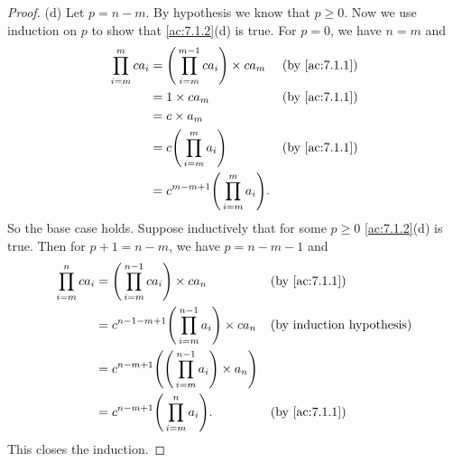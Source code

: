 \begin{proof}{(d)}
  Let \(p = n - m\).
  By hypothesis we know that \(p \geq 0\).
  Now we use induction on \(p\) to show that \cref{ac:7.1.2}(d) is true.
  For \(p = 0\), we have \(n = m\) and
  \begin{align*}
    \prod_{i = m}^m ca_i & = \Bigg(\prod_{i = m}^{m - 1} ca_i\Bigg) \times ca_m &  & \by{ac:7.1.1} \\
                         & = 1 \times ca_m                                      &  & \by{ac:7.1.1} \\
                         & = c \times a_m                                                          \\
                         & = c \Bigg(\prod_{i = m}^m a_i\Bigg)                  &  & \by{ac:7.1.1} \\
                         & = c^{m - m + 1} \Bigg(\prod_{i = m}^m a_i\Bigg).
  \end{align*}
  So the base case holds.
  Suppose inductively that for some \(p \geq 0\) \cref{ac:7.1.2}(d) is true.
  Then for \(p + 1 = n - m\), we have \(p = n - m - 1\) and
  \begin{align*}
    \prod_{i = m}^n ca_i & = \Bigg(\prod_{i = m}^{n - 1} ca_i\Bigg) \times ca_n                         &  & \by{ac:7.1.1} \\
                         & = c^{n - 1 - m + 1} \Bigg(\prod_{i = m}^{n - 1} a_i\Bigg) \times ca_n        &  & \byIH         \\
                         & = c^{n - m + 1} \Bigg(\Bigg(\prod_{i = m}^{n - 1} a_i\Bigg) \times a_n\Bigg)                    \\
                         & = c^{n - m + 1} \Bigg(\prod_{i = m}^n a_i\Bigg).                             &  & \by{ac:7.1.1}
  \end{align*}
  This closes the induction.
\end{proof}

